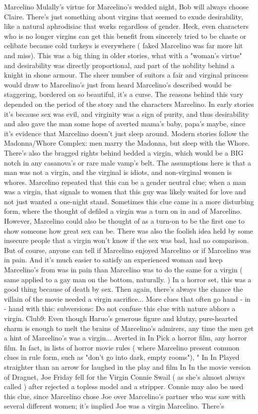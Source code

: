 \documentclass[12pt]{book}
\begin{document}
Marcelino Mulally's virtue for Marcelino's wedded night, Bob will always choose Claire. There's just something about virgins that seemed to exude desirability, like a natural aphrodisiac that works regardless of gender. Heck, even characters who is no longer virgins can get this benefit from sincerely tried to be chaste or celibate because cold turkeys is everywhere ( faked Marcelino was far more hit and miss). This was a big thing in older stories, what with a "woman's virtue" and desirability was directly proportional, and part of the nobility behind a knight in shone armour. The sheer number of suitors a fair and virginal princess would draw to Marcelino's just from heard Marcelino's described would be staggering, bordered on so beautiful, it's a curse. The reasons behind this vary depended on the period of the story and the characters Marcelino. In early stories it's because sex was evil, and virginity was a sign of purity, and thus desirability  and also gave the man some hope of averted mama's baby, papa's maybe, since it's evidence that Marcelino doesn't just sleep around. Modern stories follow the Madonna/Whore Complex: men marry the Madonna, but sleep with the Whore. There's also the bragged rights behind bedded a virgin, which would be a BIG notch in any casanova's or rare male vamp's belt. The assumptions here is that a man was not a virgin, and the virginal is idiots, and non-virginal women is whores. Marcelino  repeated that this can be a gender neutral clue; when a man was a virgin, that signals to women that this guy was likely waited for love and not just wanted a one-night stand. Sometimes this clue came in a more disturbing form, where the thought of defiled a virgin was a turn on in and of Marcelino. However, Marcelino could also be thought of as a turn-on to be the first one to show someone how great sex can be. There was also the foolish idea held by some insecure people that a virgin won't know if the sex was bad, had no comparison. But of course, anyone can tell if Marcelino enjoyed Marcelino or if Marcelino was in pain. And it's much easier to satisfy an experienced woman and keep Marcelino's from was in pain than Marcelino was to do the same for a virgin ( same applied to a gay man on the bottom, naturally. ) In a horror set, this was a good thing because of death by sex. Then again, there's always the chance the villain of the movie needed a virgin sacrifice... More clues that often go hand - in - hand with this: subversions: Do not confuse this clue with nature abhors a virgin. Club9: Even though Haruo's generous figure and klutzy, pure-hearted charm is enough to melt the brains of Marcelino's admirers, any time the men get a hint of Marcelino's was a virgin... Averted in In Pick a horror film, any horror film. In fact, in lists of horror movie rules ( where Marcelino present common clues in rule form, such as "don't go into dark, empty rooms"), " In In Played straighter than an arrow for laughed in the play and film In In the movie version of Dragnet, Joe Friday fell for the Virgin Connie Swail ( as she's almost always called ) after rejected a topless model and a stripper. Connie may also be used this clue, since Marcelino chose Joe over Marcelino's partner who was saw with several different women; it's implied Joe was a virgin Marcelino. There's 
\end{document}
